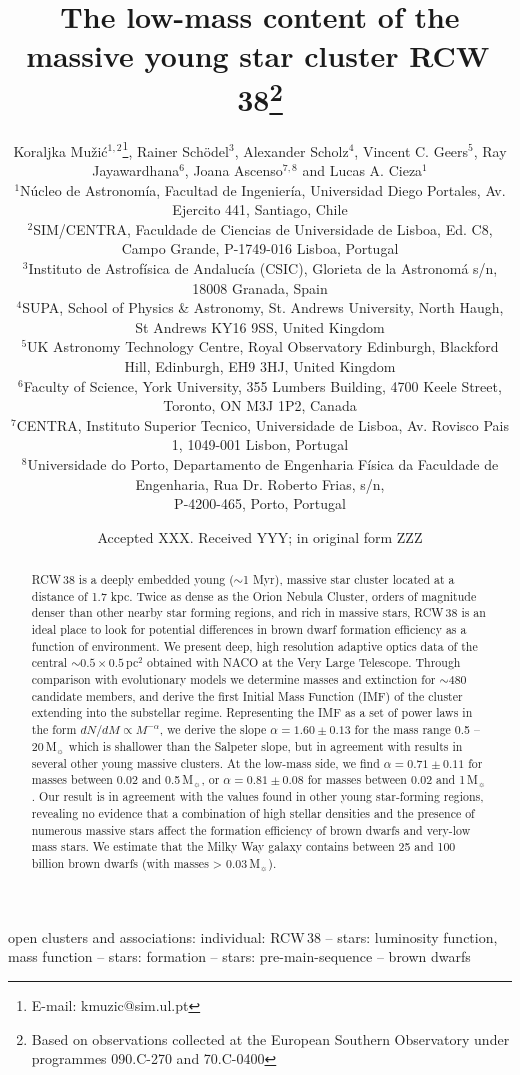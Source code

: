\documentclass[a4paper,fleqn,usenatbib]{mnras}
\title[RCW$\,$38]{The low-mass content of the massive young star cluster RCW\,38\thanks{Based on observations collected at the European Southern 
Observatory under programmes 090.C-270 and 70.C-0400}}
\author[K. Mu\v{z}i\'c et al.]{
Koraljka Mu\v{z}i\'c$^{1,2}$\thanks{E-mail: kmuzic@sim.ul.pt},
Rainer Sch\"{o}del$^{3}$,
Alexander Scholz$^{4}$,
Vincent C. Geers$^{5}$,
\newauthor
Ray Jayawardhana$^{6}$,
Joana Ascenso$^{7,8}$
and Lucas A. Cieza$^{1}$
\\
$^{1}$N\'ucleo de Astronom\'ia, Facultad de Ingenier\'ia, Universidad Diego Portales, Av. Ejercito 441, Santiago, Chile\\
$^{2}$SIM/CENTRA, Faculdade de Ciencias de Universidade de Lisboa, Ed. C8, Campo Grande, P-1749-016 Lisboa, Portugal\\
$^{3}$Instituto de Astrof\'isica de Andaluc\'ia (CSIC), Glorieta de la Astronom\'a s/n, 18008 Granada, Spain\\
$^{4}$SUPA, School of Physics \& Astronomy, St. Andrews University, North Haugh, St Andrews KY16 9SS, United Kingdom\\
$^{5}$UK Astronomy Technology Centre, Royal Observatory Edinburgh, Blackford Hill, Edinburgh, EH9 3HJ, United Kingdom\\
$^{6}$Faculty of Science, York University, 355 Lumbers Building, 4700 Keele Street, Toronto, ON M3J 1P2, Canada\\
$^{7}$CENTRA, Instituto Superior Tecnico, Universidade de Lisboa, Av. Rovisco Pais 1, 1049-001 Lisbon, Portugal\\
$^{8}$Universidade do Porto, Departamento de Engenharia F\'isica da Faculdade de Engenharia, Rua Dr. Roberto Frias, s/n, \\P-4200-465, Porto, Portugal
}
\date{Accepted XXX. Received YYY; in original form ZZZ}
\begin{document}
\label{firstpage}
\pagerange{\pageref{firstpage}--\pageref{lastpage}}
\maketitle

\begin{abstract}
RCW\,38 is a deeply embedded young ($\sim$1 Myr), massive star cluster located at a distance of 1.7 kpc. 
Twice as dense as the Orion Nebula Cluster, orders of magnitude denser than other nearby star forming regions, and rich in massive stars, 
RCW\,38 is an ideal place to look for potential differences in brown dwarf formation efficiency as a function of environment.
We present deep, high resolution adaptive optics data of the central $\sim0.5\times0.5$\,pc$^2$ obtained with NACO at the Very Large Telescope.
Through comparison with evolutionary models we determine masses and extinction for $\sim 480$ candidate members, and 
derive the first Initial Mass Function (IMF) of the cluster extending into the substellar regime.
Representing the IMF as a set of power laws in the form $dN/dM \propto M^{-\alpha}$, we derive
the slope $\alpha = 1.60 \pm 0.13$ for the mass range 0.5 -- 20\,M$_{\sun}$
which is shallower than the Salpeter slope, but 
in agreement with results in several other young massive clusters. At the low-mass side, we find $\alpha = 0.71 \pm 0.11$ for masses between 0.02 and 0.5\,M$_{\sun}$,
or $\alpha = 0.81 \pm 0.08$ for masses between 0.02 and 1\,M$_{\sun}$. Our result is in agreement with the values found in other young star-forming regions, 
revealing no evidence that a combination of high stellar densities and the presence of numerous massive stars 
affect the formation efficiency of brown dwarfs and very-low mass stars. 
 We estimate that the Milky Way galaxy contains between 25 and 100 billion brown dwarfs (with masses > 0.03\,M$_{\sun}$).

\end{abstract}

\begin{keywords}
open clusters and associations: individual: RCW\,38 -- stars: luminosity function, mass function -- stars: formation -- stars: pre-main-sequence -- brown dwarfs 
\end{keywords}
\end{document}
